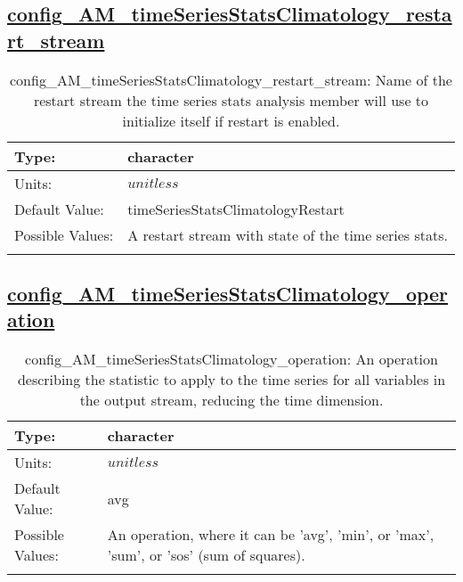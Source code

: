 \subsection[config\_AM\_timeSeriesStatsClimatology\_restart\_stream]{\hyperref[sec:nm_tab_AM_timeSeriesStatsClimatology]{config\_AM\_timeSeriesStatsClimatology\_restart\_stream}}
\label{subsec:nm_sec_config_AM_timeSeriesStatsClimatology_restart_stream}
\begin{center}
\begin{longtable}{| p{2.0in} || p{4.0in} |}
    \hline
    Type: & character \\
    \hline
    Units: & $unitless$ \\
    \hline
    Default Value: & timeSeriesStatsClimatologyRestart \\
    \hline
    Possible Values: & A restart stream with state of the time series stats. \\
    \hline
    \caption{config\_AM\_timeSeriesStatsClimatology\_restart\_stream: Name of the restart stream the time series stats analysis member will use to initialize itself if restart is enabled.}
\end{longtable}
\end{center}
\subsection[config\_AM\_timeSeriesStatsClimatology\_operation]{\hyperref[sec:nm_tab_AM_timeSeriesStatsClimatology]{config\_AM\_timeSeriesStatsClimatology\_operation}}
\label{subsec:nm_sec_config_AM_timeSeriesStatsClimatology_operation}
\begin{center}
\begin{longtable}{| p{2.0in} || p{4.0in} |}
    \hline
    Type: & character \\
    \hline
    Units: & $unitless$ \\
    \hline
    Default Value: & avg \\
    \hline
    Possible Values: & An operation, where it can be 'avg', 'min', or 'max', 'sum', or 'sos' (sum of squares). \\
    \hline
    \caption{config\_AM\_timeSeriesStatsClimatology\_operation: An operation describing the statistic to apply to the time series for all variables in the output stream, reducing the time dimension.}
\end{longtable}
\end{center}
